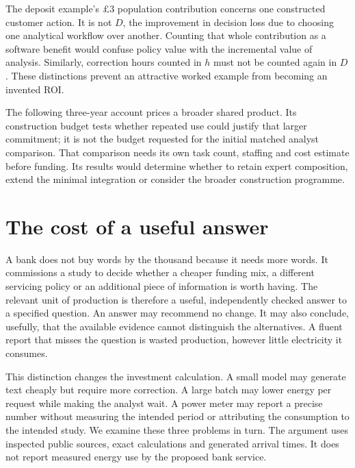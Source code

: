 The deposit example's \pounds3 population contribution concerns one
constructed customer action. It is not $D$, the improvement in decision
loss due to choosing one analytical workflow over another. Counting
that whole contribution as a software benefit would confuse policy value
with the incremental value of analysis. Similarly, correction hours
counted in $h$ must not be counted again in $D$. These distinctions
prevent an attractive worked example from becoming an invented ROI.

The following three-year account prices a broader shared product. Its
construction budget tests whether repeated use could justify that larger
commitment; it is not the budget requested for the initial matched analyst
comparison. That comparison needs its own task count, staffing and cost
estimate before funding. Its results would determine whether to retain
expert composition, extend the minimal integration or consider the broader
construction programme.




\section{The cost of a useful answer}
\label{closure:energy-study}

A bank does not buy words by the thousand because it needs more words. It
commissions a study to decide whether a cheaper funding mix, a different
servicing policy or an additional piece of information is worth having.
The relevant unit of production is therefore a useful, independently checked
answer to a specified question. An answer may recommend no change. It may
also conclude, usefully, that the available evidence cannot distinguish the
alternatives. A fluent report that misses the question is wasted production,
however little electricity it consumes.

This distinction changes the investment calculation. A small model may
generate text cheaply but require more correction. A large batch may lower
energy per request while making the analyst wait. A power meter may report a
precise number without measuring the intended period or attributing the
consumption to the intended study. We examine these three problems in turn.
The argument uses inspected public sources, exact calculations and generated
arrival times. It does not report measured energy use by the proposed bank
service.

